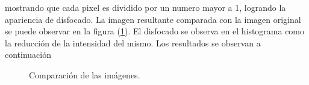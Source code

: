mostrando que cada pixel es dividido por un numero mayor a 1, logrando la apariencia de disfocado. La imagen resultante comparada con la imagen original se puede observar en la figura (\ref{fig:kernel}). El disfocado se observa en el histograma como la reducción de la intensidad del mismo. Los resultados se observan a continuación


\begin{figure}[H]
	\centering
	\caption{Comparación de las imágenes\label{fig:kernel}.}
\end{figure}	


